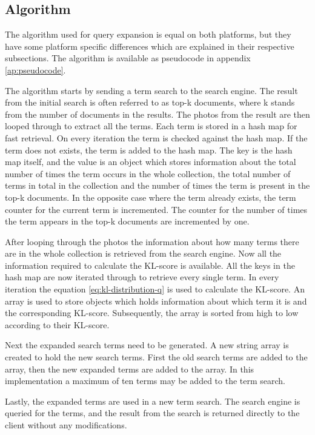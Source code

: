 \subsection{Algorithm}
\label{sec:algorithm}
The algorithm used for query expansion is equal on both platforms,
but they have some platform specific differences which are explained in their respective subsections.
The algorithm is available as pseudocode in appendix \ref{ap:pseudocode}.

The algorithm starts by sending a term search to the search engine.
The result from the initial search is often referred to as top-k documents,
where k stands from the number of documents in the results.
The photos from the result are then looped through to extract all the terms.
Each term is stored in a hash map for fast retrieval.
On every iteration the term is checked against the hash map.
If the term does not exists,
the term is added to the hash map.
The key is the hash map itself,
and the value is an object which stores information about the total number of times the term occurs in the whole collection,
the total number of terms in total in the collection and the number of times the term is present in the top-k documents.
In the opposite case where the term already exists, the term counter for the current term is incremented.
The counter for the number of times the term appears in the top-k documents are incremented by one.

After looping through the photos the information about how many terms there are in the whole collection is retrieved from the search engine.
Now all the information required to calculate the KL-score is available.
All the keys in the hash map are now iterated through to retrieve every single term.
In every iteration the equation \ref{eq:kl-distribution-q} is used to calculate the KL-score.
An array is used to store objects which holds information about which term it is and the corresponding KL-score.
Subsequently, the array is sorted from high to low according to their KL-score.

Next the expanded search terms need to be generated.
A new string array is created to hold the new search terms.
First the old search terms are added to the array,
then the new expanded terms are added to the array.
In this implementation a maximum of ten terms may be added to the term search.

Lastly, the expanded terms are used in a new term search.
The search engine is queried for the terms,
and the result from the search is returned directly to the client without any modifications.

